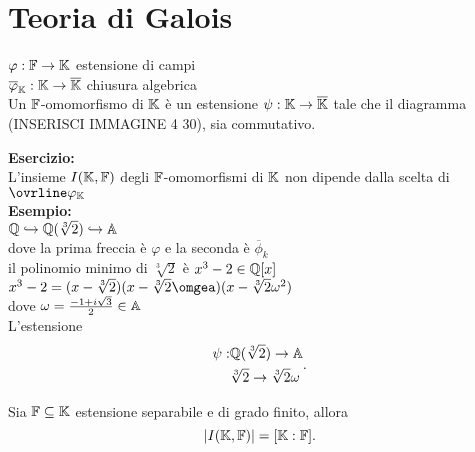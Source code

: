 \documentclass[12px]{article}
\begin{document}
	\section{Teoria di Galois}
\begin{defi}
	$\varphi: \mathbb{F} \rightarrow\mathbb{K}$ estensione di campi\\
	$\overline \varphi_{\mathbb{K}} :\mathbb{K} \rightarrow \overline {\mathbb{K}}$ chiusura algebrica\\
	Un $\mathbb{F}$-omomorfismo di $\mathbb{K}$ è un estensione  $\psi : \mathbb{K} \rightarrow \overline{\mathbb{K}}$ tale che il diagramma (INSERISCI IMMAGINE 4 30), sia commutativo.
\end{defi}
\textbf{Esercizio:}\\
L'insieme $I(\mathbb{K},\mathbb{F})$ degli  $\mathbb{F}$-omomorfismi di  $\mathbb{K}$ non dipende dalla scelta di $\ovrline \varphi_\K$\\
 \textbf{Esempio:}\\
 $\mathbb{Q}\hookrightarrow \mathbb{Q}(\sqrt[3]{2})\hookrightarrow \mathbb{A}$\\
 dove la prima freccia è $ \varphi$ e la seconda è $\overline\phi_k$\\
 il polinomio minimo di  $\sqrt[3]{2}$ è  $x^3-2\in\mathbb{Q}[x]$\\
 $x^3-2=(x-\sqrt[3]{2})(x -\sqrt[3]{2}\omgea)(x-\sqrt[3]2\omega^2)$\\
 dove $\omega = \frac{-1+i\sqrt{3}}{2}\in\mathbb{A}$\\
 L'estensione 
  \[
 \begin{aligned}
	 \psi : &\mathbb{Q}(\sqrt[3]{2}) \rightarrow \mathbb{A}\\
		&\sqrt[3]2 \rightarrow \sqrt[3]{2}\omega
 \end{aligned}
 .\] 
 \begin{prop}
 	Sia $\mathbb{F}\subseteq\mathbb{K}$ estensione separabile e di grado finito, allora 
	 \[
		 |I(\mathbb{K},\mathbb{F})| = [\mathbb{K}:\mathbb{F}]
	.\] 
 \end{prop}
\end{document}
